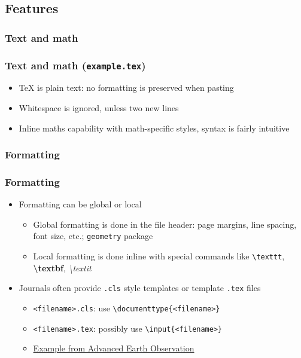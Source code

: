 \documentclass[xetex,colorlinks]{beamer} %
\begin{document}
  
  \subsection{Features}
  \subsubsection{Text and math}
  \begin{frame}
    \frametitle{Text and math (\texttt{example.tex})}
    \begin{itemize}
     \item \TeX{} is plain text: no formatting is preserved when pasting
     \item Whitespace is ignored, unless two new lines
     \item Inline maths capability with math-specific styles, syntax is fairly intuitive
    \end{itemize}
  \end{frame}
  
  \subsubsection{Formatting}
  \begin{frame}
    \frametitle{Formatting}
    \begin{itemize}
     \item Formatting can be global or local
     \begin{itemize}
      \item Global formatting is done in the file header: page margins, line spacing, font size, etc.; \texttt{geometry} package
      \item Local formatting is done inline with special commands like \texttt{\textbackslash{}texttt}, \textbf{\textbackslash{}textbf}, \textit{\textbackslash{}textit}
     \end{itemize}
     \item Journals often provide \texttt{.cls} style templates or template \texttt{.tex} files
     \begin{itemize}
      \item \texttt{<filename>.cls}: use \texttt{\textbackslash{}documenttype\{<filename>\}}
      \item \texttt{<filename>.tex}: possibly use \texttt{\textbackslash{}input\{<filename>\}}
      \item \href{http://www.isprs.org/documents/orangebook/app5.aspx}{Example from Advanced Earth Observation}
     \end{itemize}
    \end{itemize}
  \end{frame}
  
\end{document}
